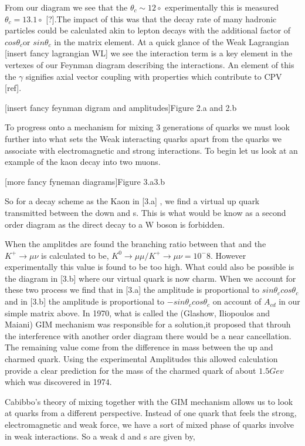From our diagram we see that the $\theta_c\sim 12\circ$ experimentally this is measured $\theta_c = 13.1\circ$ [?].The impact of this was that the decay rate of many hadronic particles could be calculated akin to lepton decays with the additional factor of $cos\theta_c$or $sin\theta_c$ in the matrix element. At a quick glance of the Weak Lagrangian [insert fancy lagrangian WL] we see the interaction term is a key element in the vertexes of our Feynman diagram describing the interactions. An element of this the $\gamma$ signifies axial vector coupling with properties which contribute to CPV [ref].

[insert fancy feynman digram and amplitudes]Figure {2.a} and {2.b}

To progress onto a mechanism for mixing 3 generations of quarks we must look further into what sets the Weak interacting quarks apart from the quarks we associate with electromagnetic and strong interactions. To begin let us look at an example of the kaon decay into two muons. 

[more fancy fyneman diagrams]Figure {3.a}{3.b}

So for a decay scheme as the Kaon in [3.a] , we find a virtual up quark transmitted between the down and s. This is what would be know as a second order diagram as the direct decay to a W boson is forbidden.

When the amplitdes are found the branching ratio between that and the $K^+\rightarrow\mu\nu$ is calculated to be,
 $K^0\rightarrow\mu\mu/K^+\rightarrow\mu\nu=10^-8$. 
However experimentally this value is found to be too high. What could also be possible is the diagram in [3.b] where our virtual quark is now charm. When we account for these two process we find that in [3.a] the amplitude is proportional to $sin\theta_c cos\theta_c$ and in [3.b] the amplitude is proportional to $-sin\theta_c cos\theta_c$ on account of $A_{cd}$ in our simple matrix above. 
In 1970, what is called the (Glashow, Iliopoulos and Maiani) GIM mechanism was responsible for a solution,it proposed that throuh the interference with another order diagram there would be a near cancellation. The remaining value come from the difference in mass between the up and charmed quark. Using the experimental Amplitudes this allowed calculation provide a clear prediction for the mass of the charmed quark of about $1.5Gev$ which was discovered in 1974.
 
Cabibbo’s theory of mixing together with the GIM mechanism allows us to look at quarks from a different perspective. Instead of one quark that feels the strong, electromagnetic and weak force, we have a sort of mixed phase of quarks involve in weak interactions. So a weak d and s are given by,

